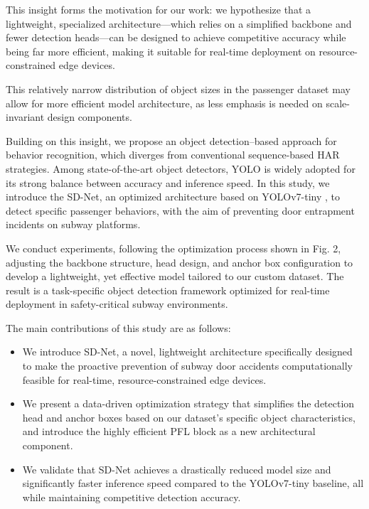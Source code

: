 \documentclass[journal,twoside,web]{ieeecolor}
\begin{document}
This insight forms the motivation for our work: we hypothesize that a lightweight, specialized architecture—which relies on a simplified backbone and fewer detection heads—can be designed to achieve competitive accuracy while being far more efficient, making it suitable for real-time deployment on resource-constrained edge devices.

This relatively narrow distribution of object sizes in the passenger dataset may allow for more efficient model architecture, as less emphasis is needed on scale-invariant design components.


Building on this insight, we propose an object detection–based approach for behavior recognition, which diverges from conventional sequence-based \ac{HAR} strategies. Among state-of-the-art object detectors, \ac{YOLO} is widely adopted for its strong balance between accuracy and inference speed. 
In this study, we introduce the \ac{SD-Net}, an optimized architecture based on YOLOv7-tiny \cite{wang_yolov7_2022}, to detect specific passenger behaviors, with the aim of preventing door entrapment incidents on subway platforms.

We conduct experiments, following the optimization process shown in Fig. 2, adjusting the backbone structure, head design, and anchor box configuration to develop a lightweight, yet effective model tailored to our custom dataset. 
The result is a task-specific object detection framework optimized for real-time deployment in safety-critical subway environments.



The main contributions of this study are as follows:
\begin{itemize}
    \item We introduce \ac{SD-Net}, a novel, lightweight architecture specifically designed to make the proactive prevention of subway door accidents computationally feasible for real-time, resource-constrained edge devices.
    
    \item We present a data-driven optimization strategy that simplifies the detection head and anchor boxes based on our dataset's specific object characteristics, and introduce the highly efficient \ac{PFL} block as a new architectural component.
    
    \item We validate that \ac{SD-Net} achieves a drastically reduced model size and significantly faster inference speed compared to the YOLOv7-tiny baseline, all while maintaining competitive detection accuracy.
\end{itemize}
\end{document}
